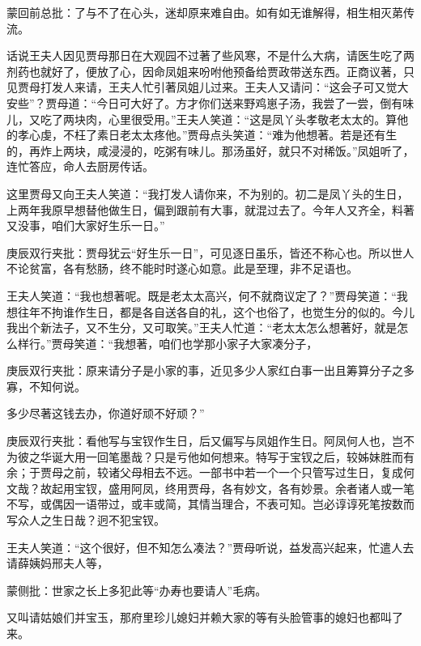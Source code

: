 \begin{parag}

    \begin{note}蒙回前总批：了与不了在心头，迷却原来难自由。如有如无谁解得，相生相灭苐传流。\end{note}
\end{parag}

\begin{parag}

    话说王夫人因见贾母那日在大观园不过著了些风寒，不是什么大病，请医生吃了两剂药也就好了，便放了心，因命凤姐来吩咐他预备给贾政带送东西。正商议著，只见贾母打发人来请，王夫人忙引著凤姐儿过来。王夫人又请问：“这会子可又觉大安些”？贾母道：“今日可大好了。方才你们送来野鸡崽子汤，我尝了一尝，倒有味儿，又吃了两块肉，心里很受用。”王夫人笑道：“这是凤丫头孝敬老太太的。算他的孝心虔，不枉了素日老太太疼他。”贾母点头笑道：“难为他想著。若是还有生的，再炸上两块，咸浸浸的，吃粥有味儿。那汤虽好，就只不对稀饭。”凤姐听了，连忙答应，命人去厨房传话。
\end{parag}


\begin{parag}


    这里贾母又向王夫人笑道：“我打发人请你来，不为别的。初二是凤丫头的生日，上两年我原早想替他做生日，偏到跟前有大事，就混过去了。今年人又齐全，料著又没事，咱们大家好生乐一日。”\begin{note}庚辰双行夹批：贾母犹云“好生乐一日”，可见逐日虽乐，皆还不称心也。所以世人不论贫富，各有愁肠，终不能时时遂心如意。此是至理，非不足语也。\end{note}王夫人笑道：“我也想著呢。既是老太太高兴，何不就商议定了？”贾母笑道：“我想往年不拘谁作生日，都是各自送各自的礼，这个也俗了，也觉生分的似的。今儿我出个新法子，又不生分，又可取笑。”王夫人忙道：“老太太怎么想著好，就是怎么样行。”贾母笑道：“我想著，咱们也学那小家子大家凑分子，\begin{note}庚辰双行夹批：原来请分子是小家的事，近见多少人家红白事一出且筹算分子之多寡，不知何说。\end{note}多少尽著这钱去办，你道好顽不好顽？”\begin{note}庚辰双行夹批：看他写与宝钗作生日，后又偏写与凤姐作生日。阿凤何人也，岂不为彼之华诞大用一回笔墨哉？只是亏他如何想来。特写于宝钗之后，较姊妹胜而有余；于贾母之前，较诸父母相去不远。一部书中若一个一个只管写过生日，复成何文哉？故起用宝钗，盛用阿凤，终用贾母，各有妙文，各有妙景。余者诸人或一笔不写，或偶因一语带过，或丰或简，其情当理合，不表可知。岂必谆谆死笔按数而写众人之生日哉？迥不犯宝钗。\end{note}王夫人笑道：“这个很好，但不知怎么凑法？”贾母听说，益发高兴起来，忙遣人去请薛姨妈邢夫人等，\begin{note}蒙侧批：世家之长上多犯此等“办寿也要请人”毛病。\end{note}又叫请姑娘们并宝玉，那府里珍儿媳妇并赖大家的等有头脸管事的媳妇也都叫了来。
\end{parag}


